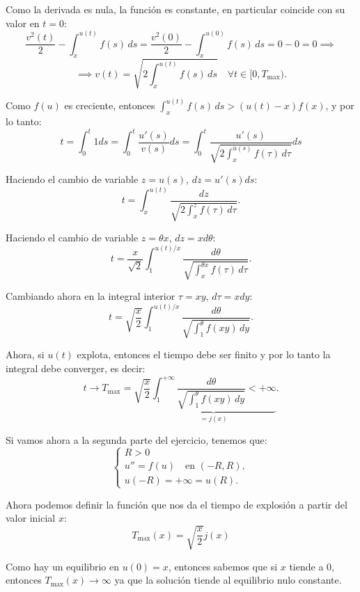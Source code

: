 {    Como la derivada es nula, la función es constante, en particular coincide con su valor en $t = 0$:
    \[
        \frac{v^2(t)}{2} - \int_x^{u(t)} f(s) \, ds = \frac{v^2(0)}{2} - \int_x^{u(0)} f(s) \, ds = 0 - 0 = 0 \implies
    \]
    \[
        \implies v(t) = \sqrt{2 \int_x^{u(t)} f(s) \, ds} \quad \forall t \in [0, T_{\max}).
    \]

    Como $f(u)$ es creciente, entonces $\int_x^{u(t)} f(s) \, ds > (u(t) - x) f(x)$, y por lo tanto:
    \[
        t =
        \int_0^t 1 ds =
        \int_0^t \frac{u'(s)}{v(s)} ds =
        \int_0^t \frac{u'(s)}{\sqrt{2 \int_x^{u(s)} f(\tau) \, d\tau}} ds
    \]

    Haciendo el cambio de variable $z = u(s)$, $dz = u'(s) ds$:
    \[
        t = \int_x^{u(t)} \frac{dz}{\sqrt{2 \int_x^z f(\tau) \, d\tau}}.
    \]

    Haciendo el cambio de variable $z = \theta x$, $dz = x d\theta$:
    \[
        t = \frac{x}{\sqrt{2}} \int_1^{u(t)/x} \frac{d\theta}{\sqrt{\int_x^{\theta x} f(\tau) \, d\tau}}.
    \]

    Cambiando ahora en la integral interior $\tau = x y$, $d\tau = x dy$:
    \[
        t = \sqrt{\frac{x}{2}} \int_1^{u(t)/x} \frac{d\theta}{\sqrt{\int_1^{\theta} f(x y) \, dy}}.
    \]

    Ahora, si $u(t)$ explota, entonces el tiempo debe ser finito y por lo tanto la integral debe converger, es decir:
    \[
    t \to T_{\max} = \sqrt{\frac{x}{2}} 
    \underbrace{\int_1^{+\infty} \frac{d\theta}{\sqrt{\int_1^{\theta} f(x y) \, dy}} < +\infty}_{=j(x)}.
    \]

    Si vamos ahora a la segunda parte del ejercicio, tenemos que:
    \[
        \begin{cases}
            R > 0 \\
            u'' = f(u) \quad \text{en } (-R, R), \\
            u(-R) = +\infty = u(R).
        \end{cases}
    \]

    Ahora podemos definir la función que nos da el tiempo de explosión a partir del valor inicial $x$:
    \[
        T_{\max}(x) = \sqrt{\frac{x}{2}} j(x)
    \]

    Como hay un equilibrio en $u(0) = x$, entonces sabemos que si $x$ tiende a $0$, entonces $T_{\max}(x) \to \infty$ ya que la solución tiende al equilibrio nulo constante.
}

